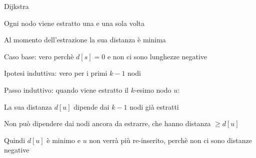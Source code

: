 \begin{frame}{Dijkstra}

\vspace{-9pt}
\begin{myboxtitle}
\BIL 
\item Ogni nodo viene estratto una e una sola volta
\item Al momento dell'estrazione la sua distanza è minima    
\EIL
\end{myboxtitle}


\BIL
\item Caso base: vero perchè $d[s]=0$ e non ci sono lunghezze negative
\item Ipotesi induttiva: vero per i primi $k-1$ nodi
\item Passo induttivo: quando viene estratto il $k$-esimo nodo $u$:
  \BI
  \item La sua distanza $d[u]$ dipende dai $k-1$ nodi già estratti
  \item Non può dipendere dai nodi ancora da estrarre, che hanno distanza $\geq d[u]$
  \item Quindi $d[u]$ è minimo e $u$ non verrà più re-inserito, perchè non ci sono distanze negative
\EI
\EIL

\end{frame}

